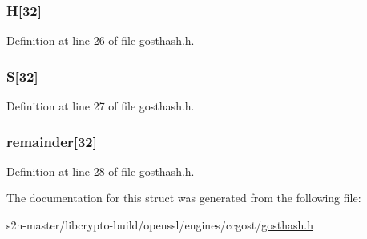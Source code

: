 \subsubsection[{\texorpdfstring{H}{H}}]{ H\mbox{[}32\mbox{]}}\hypertarget{structgost__hash__ctx_a8a7c23be1a5d440d2c1483a435be5b0b}{}\label{structgost__hash__ctx_a8a7c23be1a5d440d2c1483a435be5b0b}


Definition at line 26 of file gosthash.\+h.

\subsubsection[{\texorpdfstring{S}{S}}]{ S\mbox{[}32\mbox{]}}\hypertarget{structgost__hash__ctx_a7c3f901539cb0cc560d93e97619a3981}{}\label{structgost__hash__ctx_a7c3f901539cb0cc560d93e97619a3981}


Definition at line 27 of file gosthash.\+h.

\subsubsection[{\texorpdfstring{remainder}{remainder}}]{ remainder\mbox{[}32\mbox{]}}\hypertarget{structgost__hash__ctx_a5c05fab3a0e5b29913abebe952d7c58c}{}\label{structgost__hash__ctx_a5c05fab3a0e5b29913abebe952d7c58c}


Definition at line 28 of file gosthash.\+h.



The documentation for this struct was generated from the following file\+:\begin{DoxyCompactItemize}
\item 
s2n-\/master/libcrypto-\/build/openssl/engines/ccgost/\hyperlink{gosthash_8h}{gosthash.\+h}\end{DoxyCompactItemize}
